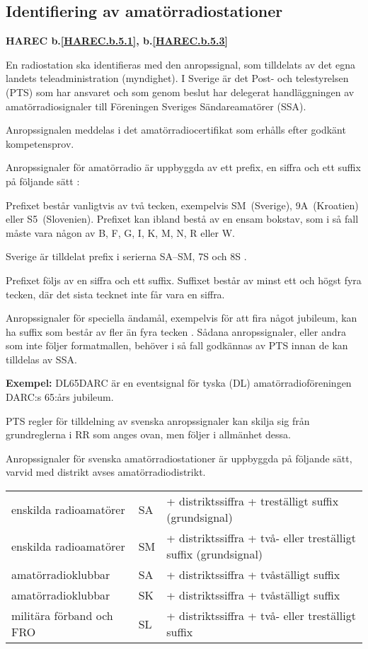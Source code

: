 \subsection{Identifiering av amatörradiostationer}
\textbf{
HAREC b.\ref{HAREC.b.5.1}\label{myHAREC.b.5.1},
 b.\ref{HAREC.b.5.3}\label{myHAREC.b.5.3}
}

En radiostation ska identifieras med den anropssignal, som tilldelats av det
egna landets teleadministration (myndighet).
I Sverige är det Post- och telestyrelsen (PTS) som har ansvaret och som genom
beslut har delegerat handläggningen av amatörradiosignaler till Föreningen
Sveriges Sändareamatörer (SSA).

Anropssignalen meddelas i det amatörradiocertifikat som erhålls efter godkänt
kompetensprov.

Anropssignaler för amatörradio är uppbyggda av ett prefix, en siffra och ett
suffix på följande sätt \cite[\S19.68, \S19.69]{ITU-RR}:

Prefixet består vanligtvis av två tecken, exempelvis SM~(Sverige), 9A~(Kroatien)
eller S5~(Slovenien).
Prefixet kan ibland bestå av en ensam bokstav, som i så fall måste vara någon
av B, F, G, I, K, M, N, R eller W.

Sverige är tilldelat prefix i serierna SA--SM, 7S och 8S
\cite[Appendix 42]{ITU-RR}.

Prefixet följs av en siffra och ett suffix. Suffixet består av minst ett och
högst fyra tecken, där det sista tecknet inte får vara en siffra.

Anropssignaler för speciella ändamål, exempelvis för att fira något jubileum,
kan ha suffix som består av fler än fyra tecken \cite[\S19.68A]{ITU-RR}.
Sådana anropssignaler, eller andra som inte följer formatmallen, behöver i så
fall godkännas av PTS innan de kan tilldelas av SSA.

\textbf{Exempel:} DL65DARC är en eventsignal för tyska (DL)
amatörradioföreningen DARC:s 65:års jubileum.

PTS regler för tilldelning av svenska anropssignaler kan skilja sig från
grundreglerna i RR som anges ovan, men följer i allmänhet dessa.

Anropssignaler för svenska amatörradiostationer är uppbyggda på följande
sätt, varvid med distrikt avses amatörradiodistrikt.

\begin{tabular}{lll}
enskilda radioamatörer & SA & + distriktssiffra + treställigt suffix (grundsignal) \\
enskilda radioamatörer & SM & + distriktssiffra + två- eller treställigt suffix (grundsignal) \\
amatörradioklubbar & SA & + distriktssiffra + tvåställigt suffix \\
amatörradioklubbar & SK & + distriktssiffra + tvåställigt suffix \\
militära förband och FRO & SL & + distriktssiffra + två- eller treställigt suffix \\
\end{tabular}

